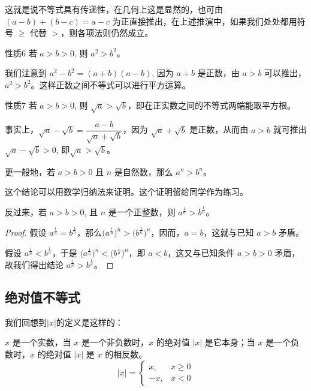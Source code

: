这就是说不等式具有传递性，在几何上这是显然的，也可由 $(a-b)+(b-c)=a-c$ 为正直接推出，在上述推演中，如果我们处处都用符号 $\geqslant $ 代替 $>$，则各项法则仍然成立。

\begin{Theorem}{性质6}
  若 $a>b>0$, 则 $a^2>b^2$。
\end{Theorem}

我们注意到 $a^2-b^2=(a+b)(a-b)$, 因为 $a+b$ 是正数，由 $a>b$ 可以推出，$a^2>b^2$。这样正数之间不等式可以进行平方运算。

\begin{Theorem}{性质7}
  若 $a>b>0$, 则 $\sqrt{a}>\sqrt{b}$，即在正实数之间的不等式两端能取平方根。
\end{Theorem}

事实上，$\sqrt{a}-\sqrt{b}=\dfrac{a-b}{\sqrt{a}+\sqrt{b}}$，因为 $\sqrt{a}+\sqrt{b}$ 是正数，从而由 $a>b$ 就可推出 $\sqrt{a}-\sqrt{b}>0$, 即$\sqrt{a}>\sqrt{b}$。

更一般地，若 $a>b>0$ 且 $n$ 是自然数，那么 $a^n>b^n$。

这个结论可以用数学归纳法来证明。这个证明留给同学作为练习。

\medskip
反过来，若 $a>b>0$, 且 $n$ 是一个正整数，则 $a^{\frac{1}{n}}>b^{\frac{1}{n}}$。

\begin{proof}
\linespread{1.5}\selectfont
假设 $a^{\frac{1}{n}}=b^{\frac{1}{n}}$，那么$\Big(a^{\tfrac{1}{n}}\Big)^n>\Big(b^{\tfrac{1}{n}}\Big)^n$，因而，$a=b$，这就与已知 $a>b$ 矛盾。

假设 $a^{\frac{1}{n}}<b^{\frac{1}{n}}$，于是 $\Big(a^{\tfrac{1}{n}}\Big)^n<\Big(b^{\tfrac{1}{n}}\Big)^n$，即 $a<b$，这又与已知条件 $a>b>0$ 矛盾，故我们得出结论 $a^{\tfrac{1}{n}}>b^{\tfrac{1}{n}}$。\par
\end{proof}

\subsection{绝对值不等式}
我们回想到$|x|$的定义是这样的：

\begin{Definition}%
$x$ 是一个实数，当 $x$ 是一个非负数时，$x$ 的绝对值 $|x|$ 是它本身；当 $x$ 是一个负数时，$x$ 的绝对值 $|x|$ 是 $x$ 的相反数。
\begin{equation}
|x|=\begin{cases}
    x,&x\geqslant 0\\
    -x,&x<0
\end{cases}
\end{equation}
\end{Definition}

